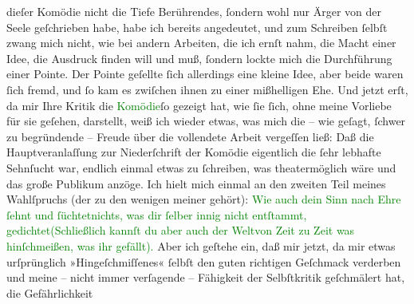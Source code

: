                     dieſer Komödie nicht die Tiefe Berührendes, ſondern wohl nur Ärger von der Seele
                    geſchrieben habe, habe ich bereits angedeutet, und zum Schreiben ſelbſt zwang
                    mich nicht, wie bei andern Arbeiten, die ich ernſt nahm, die Macht einer Idee,
                    die Ausdruck finden will und muß, ſondern lockte mich die Durchführung einer
                    Pointe. Der Pointe geſellte ſich allerdings eine kleine Idee, aber beide waren
                    ſich fremd, und ſo kam es zwiſchen ihnen zu einer mißhelligen Ehe.\pend
           \pstart
           Und jetzt erſt, da mir Ihre Kritik die \textcolor{green}{Komödie}{}ſo gezeigt hat, wie ſie ſich, ohne meine
                    Vorliebe für sie geſehen, darstellt, weiß ich
                    wieder etwas, was mich die – wie geſagt, ſchwer zu begründende – Freude über die
                    vollendete Arbeit vergeſſen ließ: Daß die Hauptveranlaſſung zur Niederſchrift
                    der Komödie eigentlich die ſehr lebhafte Sehnſucht war, endlich einmal etwas zu
                    ſchreiben, was theatermöglich wäre und das große Publikum anzöge. Ich hielt mich
                    einmal an den zweiten Teil meines Wahlſpruchs (der zu den wenigen meiner \label{K_L02215_1v}\label{K_L02215_1h} gehört):\pend
           \stanza{}{\pb}\textcolor{green}{Wie auch dein Sinn nach Ehre
                            ſehnt und ſüchtet}{}\newverse{}\textcolor{green}{nichts, was dir ſelber innig
                            nicht entſtammt, gedichtet}{}\newverse{}\textcolor{green}{(Schließlich kannſt du aber
                            auch der Welt}{}\newverse{}\textcolor{green}{von Zeit zu Zeit was
                            hinſchmeißen, was ihr gefällt).}{}\stanzaend{}\pstart
           Aber ich geſtehe ein, daß mir jetzt, da mir etwas urſprünglich »Hingeſchmiſſenes«
                    ſelbſt den guten richtigen Geſchmack verderben und meine – nicht immer
                    verſagende – Fähigkeit der Selbſtkritik geſchmälert hat, die Gefährlichkeit
